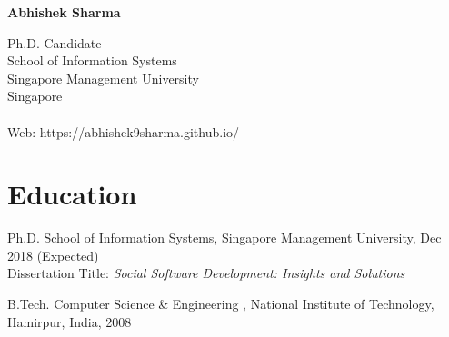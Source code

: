 \documentclass[12pt,letterpaper]{article}
\newcommand{\myname}{Abhishek Sharma}
\newcommand{\namefont}[1]{{\normalfont\bfseries\Huge{#1}}}
\begin{document}
\raggedright

\namefont{\myname}

\vspace{1em}
\begin{minipage}[t]{0.495\textwidth}
Ph.D. Candidate\\
  School of Information Systems\\
Singapore Management University \\
Singapore\\
\\
Web: https://abhishek9sharma.github.io/
\end{minipage}
%



\section*{Education}

\begin{tablist}
	
\item[Ph.D.] \tab School of Information Systems, Singapore Management University, Dec 2018 (Expected) \\
                  Dissertation Title: \textit{Social Software Development: Insights and Solutions} \\
                  
                 

\item[B.Tech.]  \tab Computer Science \& Engineering , National Institute of Technology,  Hamirpur, India, 2008

\end{tablist}
\end{document}
